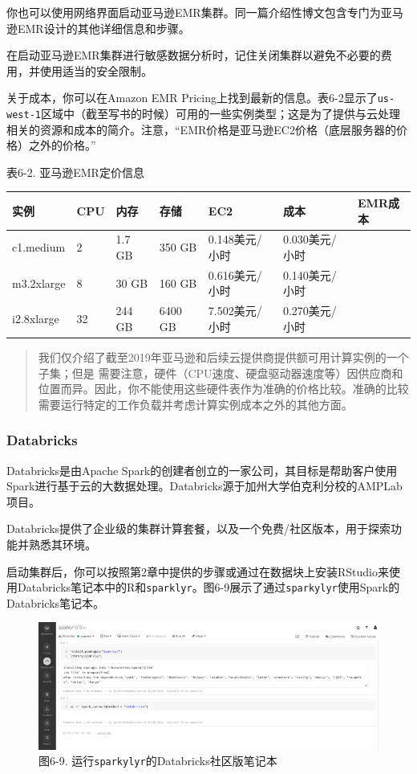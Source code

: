 \documentclass[
]{article}
\begin{document}
你也可以使用网络界面启动亚马逊EMR集群。同一篇介绍性博文包含专门为亚马逊EMR设计的其他详细信息和步骤。

在启动亚马逊EMR集群进行敏感数据分析时，记住关闭集群以避免不必要的费用，并使用适当的安全限制。

关于成本，你可以在Amazon EMR
Pricing上找到最新的信息。表6-2显示了\texttt{us-west-1}区域中（截至写书的时候）可用的一些实例类型；这是为了提供与云处理相关的资源和成本的简介。注意，``EMR价格是亚马逊EC2价格（底层服务器的价格）之外的价格。''

表6-2. 亚马逊EMR定价信息

\begin{longtable}[]{@{}lllllll@{}}
\toprule
实例 & CPU & 内存 & 存储 & EC2 & 成本 & EMR成本\tabularnewline
\midrule
\endhead
c1.medium & 2 & 1.7 GB & 350 GB & 0.148美元/小时 & 0.030美元/小时
&\tabularnewline
m3.2xlarge & 8 & 30 GB & 160 GB & 0.616美元/小时 & 0.140美元/小时
&\tabularnewline
i2.8xlarge & 32 & 244 GB & 6400 GB & 7.502美元/小时 & 0.270美元/小时
&\tabularnewline
\bottomrule
\end{longtable}

\begin{quote}
我们仅介绍了截至2019年亚马逊和后续云提供商提供额可用计算实例的一个子集；但是
需要注意，硬件（CPU速度、硬盘驱动器速度等）因供应商和位置而异。因此，你不能使用这些硬件表作为准确的价格比较。准确的比较需要运行特定的工作负载并考虑计算实例成本之外的其他方面。
\end{quote}

\hypertarget{databricks}{%
\subsubsection{Databricks}\label{databricks}}

Databricks是由Apache
Spark的创建者创立的一家公司，其目标是帮助客户使用Spark进行基于云的大数据处理。Databricks源于加州大学伯克利分校的AMPLab项目。

Databricks提供了企业级的集群计算套餐，以及一个免费/社区版本，用于探索功能并熟悉其环境。

启动集群后，你可以按照第2章中提供的步骤或通过在数据块上安装RStudio来使用Databricks笔记本中的R和\texttt{sparklyr}。图6-9展示了通过\texttt{sparkylyr}使用Spark的Databricks笔记本。

\begin{figure}
\centering
\includegraphics{figures/6_9.png}
\caption{图6-9. 运行\texttt{sparkylyr}的Databricks社区版笔记本}
\end{figure}
\end{document}
